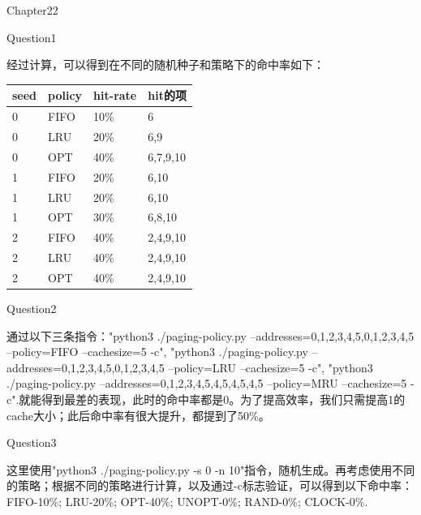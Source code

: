 \documentclass[12pt]{article}
\begin{document}
\begin{LARGE}
    \noindent Chapter22\\
\end{LARGE}
\begin{large}
	\noindent Question1\\
\end{large}
\hspace*{2em}经过计算，可以得到在不同的随机种子和策略下的命中率如下：\\
\begin{tabular}{p{4cm}p{4cm}p{4cm}p{3cm}}  %
    \toprule[2pt]
    seed & policy & hit-rate & hit的项 \\ %
    \midrule[2pt]
    0    & FIFO       & 10\%    & 6          \\
    0    & LRU        & 20\%     & 6,9         \\
    0    & OPT  & 40\%   & 6,7,9,10           \\
    1    & FIFO   & 20\%           &  6,10   \\
    1    & LRU       & 20\%        &  6,10     \\
    1    & OPT       & 30\%        & 6,8,10      \\
    2    & FIFO   & 40\%           & 2,4,9,10  \\
    2    & LRU   & 40\%    & 2,4,9,10\\
    2    & OPT      & 40\%         & 2,4,9,10       \\
    \bottomrule[2pt]
\end{tabular}
\newpage
\begin{large}
	\noindent Question2\\
\end{large}
\hspace*{2em}通过以下三条指令："python3 ./paging-policy.py --addresses=0,1,2,3,4,5,0,1,2,3,4,5 --policy=FIFO --cachesize=5 -c",
"python3 ./paging-policy.py --addresses=0,1,2,3,4,5,0,1,2,3,4,5 --policy=LRU --cachesize=5 -c",
"python3 ./paging-policy.py --addresses=0,1,2,3,4,5,4,5,4,5,4,5 --policy=MRU --cachesize=5 -c".就能得到最差的表现，此时的命中率都是0。为了提高效率，我们只需提高1的cache大小；此后命中率有很大提升，都提到了50\%。\\

\begin{large}
	\noindent Question3\\
\end{large}
\hspace*{2em}这里使用"python3 ./paging-policy.py -s 0 -n 10"指令，随机生成。再考虑使用不同的策略；根据不同的策略进行计算，以及通过-c标志验证，可以得到以下命中率：FIFO-10\%; LRU-20\%; OPT-40\%; UNOPT-0\%; RAND-0\%; CLOCK-0\%.\\
\end{document}

